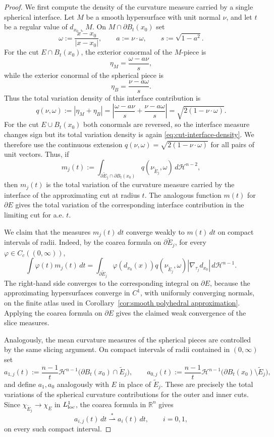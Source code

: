 \documentclass[reqno,11pt]{amsart}
\newcommand{\R}{\mathbb R}
\newcommand{\HH}{\mathscr H}
\numberwithin{equation}{section}
\theoremstyle{remark}
\begin{document}
\begin{proof}
We first compute the density of the curvature measure carried by a single
spherical interface. Let
$M$ be a smooth hypersurface with unit normal $\nu$, and let $t$ be a regular
value of $d_{x_0}\llcorner M$. On $M\cap\partial B_t(x_0)$ set
\[
\omega:=\frac{x-x_0}{|x-x_0|},\qquad a:=\nu\cdot\omega,\qquad
s:=\sqrt{1-a^2}.
\]
For the cut $E\cap B_t(x_0)$, the exterior conormal of the $M$-piece is
\[
\eta_M=\frac{\omega-a\nu}{s},
\]
while the exterior conormal of the spherical piece is
\[
\eta_B=\frac{\nu-a\omega}{s}.
\]
Thus the total variation density of this interface contribution is
\begin{equation}\label{eq:cut-interface-density}
q(\nu,\omega):=|\eta_M+\eta_B|
=\left|\frac{\omega-a\nu}{s}+\frac{\nu-a\omega}{s}\right|
=\sqrt{2(1-\nu\cdot\omega)} .
\end{equation}
For the cut $E\cup B_t(x_0)$ both conormals are reversed, so the interface
measure changes sign but its total variation density is again
\eqref{eq:cut-interface-density}. We therefore use the continuous extension
$q(\nu,\omega)=\sqrt{2(1-\nu\cdot\omega)}$ for all pairs of unit vectors. Thus,
if
\[
m_j(t):=\int_{\partial\widetilde E_j\cap\partial B_t(x_0)}
q(\nu_{\widetilde E_j},\omega)\,d\HH^{n-2},
\]
then $m_j(t)$ is the total variation of the curvature measure carried by the
interface of the approximating cut at radius $t$. The analogous function $m(t)$
for $\partial E$ gives the total variation of the corresponding interface
contribution in the limiting cut for a.e. $t$.

We claim that the measures $m_j(t)\,dt$ converge weakly to $m(t)\,dt$ on
compact intervals of radii. Indeed, by the coarea formula on
$\partial\widetilde E_j$, for every $\varphi\in C_c((0,\infty))$,
\[
\int\varphi(t)m_j(t)\,dt
=\int_{\partial\widetilde E_j}
\varphi(d_{x_0}(x))q(\nu_{\widetilde E_j},\omega)
|\nabla_{\tau_j}d_{x_0}|\,d\HH^{n-1}.
\]
The right-hand side converges to the corresponding integral on $\partial E$,
because the approximating hypersurfaces converge in $C^1$, with uniformly
converging normals, on the finite atlas used in
Corollary~\ref{cor:smooth polyhedral approximation}.
Applying the coarea formula on $\partial E$ gives the claimed weak convergence
of the slice measures.

Analogously, the mean curvature measures of the spherical pieces are
controlled by the same slicing argument. On compact intervals of radii contained
in $(0,\infty)$ set
\[
a_{1,j}(t):=\frac{n-1}{t}\HH^{n-1}
\bigl(\partial B_t(x_0)\cap\widetilde E_j\bigr),
\qquad
a_{0,j}(t):=\frac{n-1}{t}\HH^{n-1}
\bigl(\partial B_t(x_0)\setminus\widetilde E_j\bigr),
\]
and define $a_1,a_0$ analogously with $E$ in place of
$\widetilde E_j$. These are precisely the total variations of the spherical
curvature contributions for the outer and inner cuts. Since
$\chi_{\widetilde E_j}\to\chi_E$ in $L^1_{\rm loc}$, the coarea formula in
$\R^n$ gives
\[
a_{i,j}(t)\,dt\stackrel{*}{\rightharpoonup}a_i(t)\,dt,\qquad i=0,1,
\]
on every such compact interval.


\end{proof}
\end{document}
